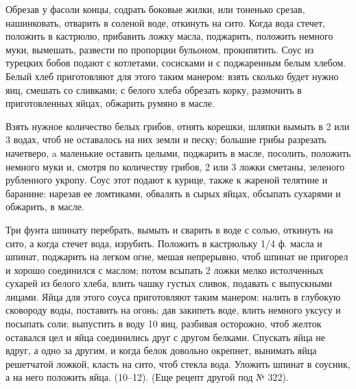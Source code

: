 
Обрезав у фасоли концы, содрать боковые жилки, или тоненько срезав, нашинковать, отварить в соленой воде, откинуть на сито. Когда вода стечет, положить в кастрюлю, прибавить ложку масла, поджарить, положить немного муки, вымешать, развести по пропорции бульоном, прокипятить. Соус из турецких бобов подают с котлетами, сосисками и с поджаренным белым хлебом. Белый хлеб приготовляют для этого таким манером: взять сколько будет нужно яиц, смешать со сливками; с белого хлеба обрезать корку, размочить в приготовленных яйцах, обжарить румяно в масле. 


Взять нужное количество белых грибов, отнять корешки, шляпки вымыть в 2 или 3 водах, чтоб не оставалось на них земли и песку; большие грибы разрезать начетверо, a маленькие оставить целыми, поджарить в масле, посолить, положить немного муки и, смотря по количеству грибов, 2 или 3 ложки сметаны, зеленого рубленного укропу. Соус этот подают к курице, также к жареной телятине и баранине: нарезав ее ломтиками, обвалять в сырых яйцах, обсыпать сухарями и обжарить, в масле. 


Три фунта шпинату перебрать, вымыть и сварить в воде с солью, откинуть на сито, а когда стечет вода, изрубить. Положить в кастрюльку 1/4 ф. масла и шпинат, поджарить на легком огне, мешая непрерывно, чтоб шпинат не пригорел и хорошо соединился с маслом; потом всыпать 2 ложки мелко истолченных сухарей из белого хлеба, влить чашку густых сливок, подавать с выпускными лицами. Яйца для этого соуса приготовляют таким манером: налить в глубокую сковороду воды, поставить на огонь; дав закипеть воде, влить немного уксусу и посыпать соли; выпустить в воду 10 яиц, разбивая осторожно, чтоб желток оставался цел и яйца соединились друг с другом белками. Спускать яйца не вдруг, а одно за другим, и когда белок довольно окрепнет, вынимать яйца решетчатой ложкой, класть на сито, чтоб стекла вода. Уложить шпинат в соусник, а на него положить яйца. (10--12). (Еще рецепт другой под № 322). 


